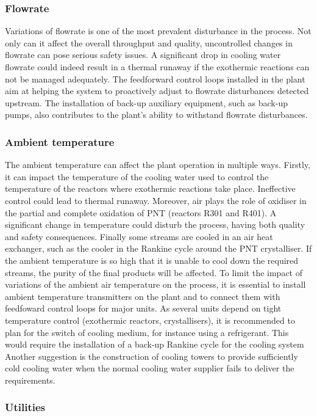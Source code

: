 \subsubsection{Flowrate}
Variations of flowrate is one of the most prevalent disturbance in the process. Not only can it affect the overall throughput and quality, uncontrolled changes in flowrate can pose serious safety issues. A significant drop in cooling water flowrate could indeed result in a thermal runaway if the exothermic reactions can not be managed adequately. The feedforward control loops installed in the plant aim at helping the system to proactively adjust to flowrate disturbances detected upstream. The installation of back-up auxiliary equipment, such as back-up pumps, also contributes to the plant's ability to withstand flowrate disturbances.


\subsubsection{Ambient temperature}

The ambient temperature can affect the plant operation in multiple ways. Firstly, it can impact the temperature of the cooling water used to control the temperature of the reactors where exothermic reactions take place. Ineffective control could lead to thermal runaway. Moreover, air plays the role of oxidiser in the partial and complete oxidation of PNT (reactors R301 and R401). A significant change in temperature could disturb the process, having both quality and safety consequences. Finally some streams are cooled in an air heat exchanger, such as the cooler in the Rankine cycle around the PNT crystalliser. If the ambient temperature is so high that it is unable to cool down the required streams, the purity of the final products will be affected. To limit the impact of variations of the ambient air temperature on the process, it is essential to install ambient temperature transmitters on the plant and to connect them with feedfoward control loops for major units. As several units depend on tight temperature control (exothermic reactors, crystallisers), it is recommended to plan for the switch of cooling medium, for instance using a refrigerant. This would require the installation of a back-up Rankine cycle for the cooling system Another suggestion is the construction of cooling towers to provide sufficiently cold cooling water when the normal cooling water supplier fails to deliver the requirements.

\subsubsection{Utilities}

